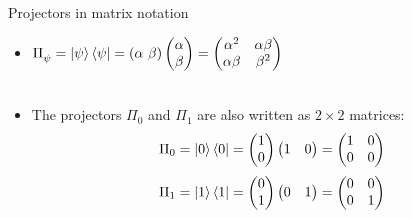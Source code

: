 \documentclass[aspectratio=169,12pt]{beamer}
\begin{document}
\begin{frame}{Projectors in matrix notation}
  \begin{itemize}[<+->]
    \setlength{\itemsep}{0.6em}
    \item $\Pi_\psi^{} = \ket \psi \bra \psi = (\alpha \  \beta) \begin{pmatrix}
    \alpha \\ \beta
    \end{pmatrix} = \begin{pmatrix}
      \alpha^2 & \alpha \beta\\
      \alpha \beta & \beta^2
    \end{pmatrix}$\\~\\
    \item The projectors $\Pi_0$ and $\Pi_1$ are also written as $2\times 2$ matrices:
    $$\Pi_0 = \ket{0}\bra{0} =
      \begin{pmatrix}1\\0\end{pmatrix}\begin{pmatrix}1 & 0\end{pmatrix}
      = \begin{pmatrix}1 & 0\\0 & 0\end{pmatrix}$$
    $$\Pi_1 = \ket{1}\bra{1} =
      \begin{pmatrix}0\\1\end{pmatrix}\begin{pmatrix}0 & 1\end{pmatrix}
      = \begin{pmatrix}0 & 0\\0 & 1\end{pmatrix}$$
  \end{itemize}
\end{frame}
\end{document}
